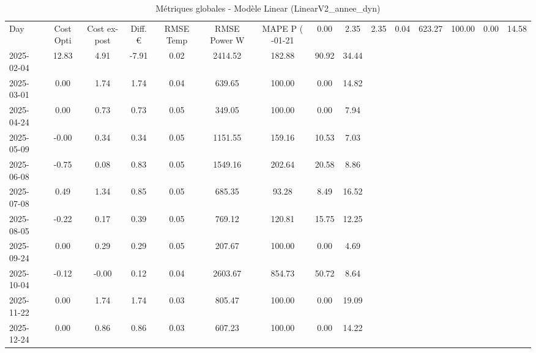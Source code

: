 \begin{table}
\caption{Métriques globales - Modèle Linear (LinearV2_annee_dyn)}
\label{tab:Linear_LinearV2_annee_dyn_Validation_EPlus_VS_Opti}
\begin{small}
\begin{tabular}{lcccccccc}
\toprule
Day & Cost Opti & Cost ex-post & Diff. € & RMSE Temp & RMSE Power W & MAPE P (%
-01-21 & 0.00 & 2.35 & 2.35 & 0.04 & 623.27 & 100.00 & 0.00 & 14.58 \\
2025-02-04 & 12.83 & 4.91 & -7.91 & 0.02 & 2414.52 & 182.88 & 90.92 & 34.44 \\
2025-03-01 & 0.00 & 1.74 & 1.74 & 0.04 & 639.65 & 100.00 & 0.00 & 14.82 \\
2025-04-24 & 0.00 & 0.73 & 0.73 & 0.05 & 349.05 & 100.00 & 0.00 & 7.94 \\
2025-05-09 & -0.00 & 0.34 & 0.34 & 0.05 & 1151.55 & 159.16 & 10.53 & 7.03 \\
2025-06-08 & -0.75 & 0.08 & 0.83 & 0.05 & 1549.16 & 202.64 & 20.58 & 8.86 \\
2025-07-08 & 0.49 & 1.34 & 0.85 & 0.05 & 685.35 & 93.28 & 8.49 & 16.52 \\
2025-08-05 & -0.22 & 0.17 & 0.39 & 0.05 & 769.12 & 120.81 & 15.75 & 12.25 \\
2025-09-24 & 0.00 & 0.29 & 0.29 & 0.05 & 207.67 & 100.00 & 0.00 & 4.69 \\
2025-10-04 & -0.12 & -0.00 & 0.12 & 0.04 & 2603.67 & 854.73 & 50.72 & 8.64 \\
2025-11-22 & 0.00 & 1.74 & 1.74 & 0.03 & 805.47 & 100.00 & 0.00 & 19.09 \\
2025-12-24 & 0.00 & 0.86 & 0.86 & 0.03 & 607.23 & 100.00 & 0.00 & 14.22 \\
\bottomrule
\end{tabular}
\end{small}
\end{table}
